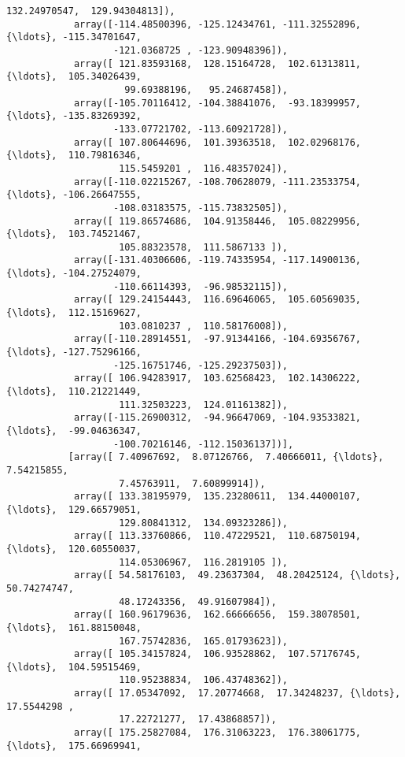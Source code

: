 \documentclass[11pt]{article}
\begin{document}
\begin{Verbatim}[commandchars=\\\{\}]
                    132.24970547,  129.94304813]),
            array([-114.48500396, -125.12434761, -111.32552896, {\ldots}, -115.34701647,
                   -121.0368725 , -123.90948396]),
            array([ 121.83593168,  128.15164728,  102.61313811, {\ldots},  105.34026439,
                     99.69388196,   95.24687458]),
            array([-105.70116412, -104.38841076,  -93.18399957, {\ldots}, -135.83269392,
                   -133.07721702, -113.60921728]),
            array([ 107.80644696,  101.39363518,  102.02968176, {\ldots},  110.79816346,
                    115.5459201 ,  116.48357024]),
            array([-110.02215267, -108.70628079, -111.23533754, {\ldots}, -106.26647555,
                   -108.03183575, -115.73832505]),
            array([ 119.86574686,  104.91358446,  105.08229956, {\ldots},  103.74521467,
                    105.88323578,  111.5867133 ]),
            array([-131.40306606, -119.74335954, -117.14900136, {\ldots}, -104.27524079,
                   -110.66114393,  -96.98532115]),
            array([ 129.24154443,  116.69646065,  105.60569035, {\ldots},  112.15169627,
                    103.0810237 ,  110.58176008]),
            array([-110.28914551,  -97.91344166, -104.69356767, {\ldots}, -127.75296166,
                   -125.16751746, -125.29237503]),
            array([ 106.94283917,  103.62568423,  102.14306222, {\ldots},  110.21221449,
                    111.32503223,  124.01161382]),
            array([-115.26900312,  -94.96647069, -104.93533821, {\ldots},  -99.04636347,
                   -100.70216146, -112.15036137])],
           [array([ 7.40967692,  8.07126766,  7.40666011, {\ldots},  7.54215855,
                    7.45763911,  7.60899914]),
            array([ 133.38195979,  135.23280611,  134.44000107, {\ldots},  129.66579051,
                    129.80841312,  134.09323286]),
            array([ 113.33760866,  110.47229521,  110.68750194, {\ldots},  120.60550037,
                    114.05306967,  116.2819105 ]),
            array([ 54.58176103,  49.23637304,  48.20425124, {\ldots},  50.74274747,
                    48.17243356,  49.91607984]),
            array([ 160.96179636,  162.66666656,  159.38078501, {\ldots},  161.88150048,
                    167.75742836,  165.01793623]),
            array([ 105.34157824,  106.93528862,  107.57176745, {\ldots},  104.59515469,
                    110.95238834,  106.43748362]),
            array([ 17.05347092,  17.20774668,  17.34248237, {\ldots},  17.5544298 ,
                    17.22721277,  17.43868857]),
            array([ 175.25827084,  176.31063223,  176.38061775, {\ldots},  175.66969941,

\end{Verbatim}
\end{document}

